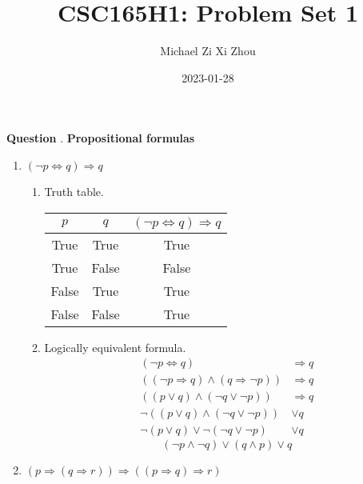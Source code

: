 \documentclass{article}
\title{CSC165H1: Problem Set 1}
\author{Michael Zi Xi Zhou}
\date{2023-01-28}
\newcounter{qcount}
\newcommand\q{\stepcounter{qcount} \textbf{Question \theqcount}. }
\begin{document}
\maketitle

\q \textbf{Propositional formulas}

\begin{enumerate}[label= (\alph*)]
    \item $ (\neg p \Leftrightarrow q) \Rightarrow q$ 
        \begin{enumerate}[label=(\roman*)]
            \item Truth table. 
                \begin{center}
                    \begin{tabular}{| c c c |}
                \hline 
                $p$ & $q$ & $(\neg p \Leftrightarrow q) \Rightarrow q$ \\
                \hline 
                True & True & True \\
                True & False & False \\
                False & True & True \\
                False & False & True \\
                \hline
                    \end{tabular}
                \end{center}
            \item Logically equivalent formula.
                \begin{align*}
                    (\neg p \Leftrightarrow q) &\Rightarrow q \\
                    ( ( \neg p \Rightarrow q) \land ( q \Rightarrow \neg p)) 
                                               &\Rightarrow q \\
                    ( ( p \lor q ) \land (\neg q \lor \neg p)) &\Rightarrow q \\
                    \neg ( ( p \lor q ) \land (\neg q \lor \neg p)) &\lor q \\
                    \neg(p \lor q) \lor \neg ( \neg q \lor \neg p) &\lor q 
                \end{align*}
                $$\boxed{ (\neg p \land \neg q) \lor (q \land p) \lor q}$$
        \end{enumerate}
    \item $ (p \Rightarrow (q \Rightarrow r)) \Rightarrow ( (p \Rightarrow q) \Rightarrow r)$
        \begin{enumerate}[label= (\roman*)]

\end{enumerate}
\end{enumerate}
\end{document}
